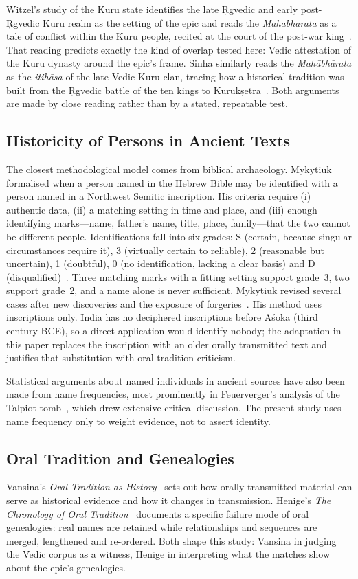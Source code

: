 \documentclass[journal]{IEEEtran}
\newcommand{\MBh}{\textit{Mahābhārata}}
\begin{document}
Witzel's study of the Kuru state identifies the late Ṛgvedic and early post-Ṛgvedic Kuru realm as the setting
of the epic and reads the \MBh{} as a tale of conflict within the Kuru people, recited at the court of the post-war
king~\cite{witzel1995}. That reading predicts exactly the kind of overlap tested here: Vedic attestation of the Kuru
dynasty around the epic's frame. Sinha similarly reads the \MBh{} as the \textit{itihāsa} of the late-Vedic Kuru clan,
tracing how a historical tradition was built from the Ṛgvedic battle of the ten kings to Kurukṣetra~\cite{sinha2021}.
Both arguments are made by close reading rather than by a stated, repeatable test.

\subsection{Historicity of Persons in Ancient Texts}
The closest methodological model comes from biblical archaeology. Mykytiuk~\cite{mykytiuk2004} formalised when a
person named in the Hebrew Bible may be identified with a person named in a Northwest Semitic inscription. His
criteria require (i) authentic data, (ii) a matching setting in time and place, and (iii) enough identifying
marks---name, father's name, title, place, family---that the two cannot be different people. Identifications fall into
six grades: S (certain, because singular circumstances require it), 3 (virtually certain to reliable), 2 (reasonable but
uncertain), 1 (doubtful), 0 (no identification, lacking a clear basis) and D (disqualified)~\cite{mykytiuk2004,freelib2007}.
Three matching marks with a fitting setting support grade~3, two support grade~2, and a name alone is never sufficient. Mykytiuk revised several cases after new discoveries and the exposure of forgeries~\cite{mykytiuk2009}.
His method uses inscriptions only. India has no deciphered inscriptions before Aśoka (third century BCE), so a
direct application would identify nobody; the adaptation in this paper replaces the inscription with an older
orally transmitted text and justifies that substitution with oral-tradition criticism.

Statistical arguments about named individuals in ancient sources have also been made from name frequencies, most
prominently in Feuerverger's analysis of the Talpiot tomb~\cite{feuerverger2008}, which drew extensive critical
discussion. The present study uses name frequency only to weight evidence, not to assert identity.

\subsection{Oral Tradition and Genealogies}
Vansina's \textit{Oral Tradition as History}~\cite{vansina1985} sets out how orally transmitted material can serve
as historical evidence and how it changes in transmission. Henige's \textit{The Chronology of Oral
Tradition}~\cite{henige1974} documents a specific failure mode of oral genealogies: real names are retained while
relationships and sequences are merged, lengthened and re-ordered. Both shape this study: Vansina in judging the
Vedic corpus as a witness, Henige in interpreting what the matches show about the epic's genealogies.
\end{document}
